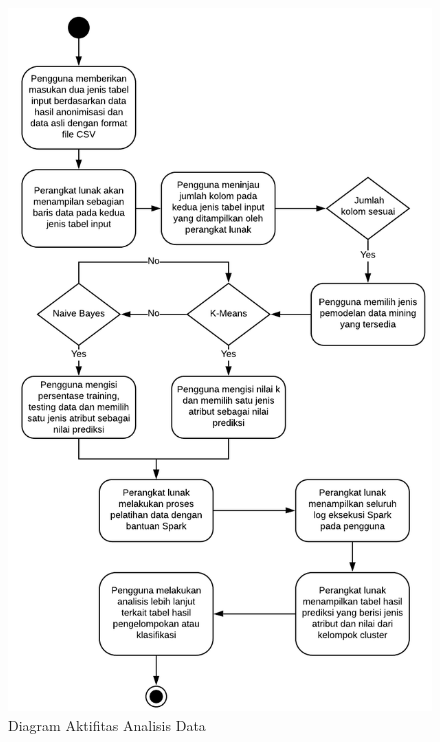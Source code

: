 \documentclass[a4paper,twoside]{article}
\begin{document}
\begin{enumerate}
\begin{figure}[H]
	\centering
	\includegraphics[scale=0.8]{pl_analisis}
	\caption{Diagram Aktifitas Analisis Data}
	\label{fig:pl_analisis}
\end{figure}
		
		
		
\end{enumerate}
\end{document}
